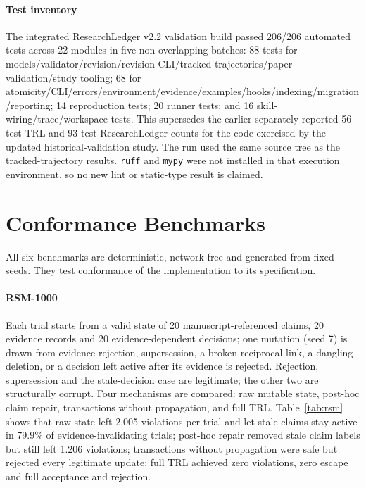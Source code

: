 \documentclass[journal]{IEEEtran}
\begin{document}
\paragraph{Test inventory}
The integrated ResearchLedger v2.2 validation build passed 206/206 automated tests across 22 modules in five non-overlapping batches: 88 tests for models/validator/revision/revision CLI/tracked trajectories/paper validation/study tooling; 68 for atomicity/CLI/errors/environment/evidence/examples/hooks/indexing/migration/reporting; 14 reproduction tests; 20 runner tests; and 16 skill-wiring/trace/workspace tests. This supersedes the earlier separately reported 56-test TRL and 93-test ResearchLedger counts for the code exercised by the updated historical-validation study. The run used the same source tree as the tracked-trajectory results. \texttt{ruff} and \texttt{mypy} were not installed in that execution environment, so no new lint or static-type result is claimed.

\section{Conformance Benchmarks}
All six benchmarks are deterministic, network-free and generated from fixed seeds. They test conformance of the implementation to its specification.

\paragraph{RSM-1000} Each trial starts from a valid state of 20 manuscript-referenced claims, 20 evidence records and 20 evidence-dependent decisions; one mutation (seed 7) is drawn from evidence rejection, supersession, a broken reciprocal link, a dangling deletion, or a decision left active after its evidence is rejected. Rejection, supersession and the stale-decision case are legitimate; the other two are structurally corrupt. Four mechanisms are compared: raw mutable state, post-hoc claim repair, transactions without propagation, and full TRL. Table~\ref{tab:rsm} shows that raw state left 2.005 violations per trial and let stale claims stay active in 79.9\% of evidence-invalidating trials; post-hoc repair removed stale claim labels but still left 1.206 violations; transactions without propagation were safe but rejected every legitimate update; full TRL achieved zero violations, zero escape and full acceptance and rejection.
\end{document}
